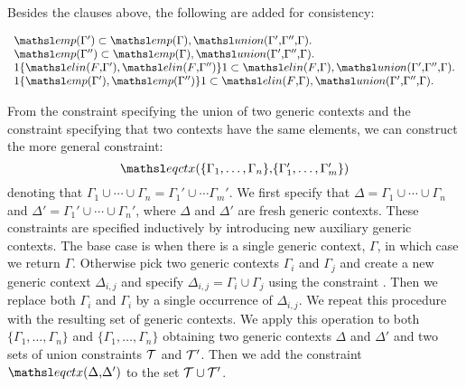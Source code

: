 Besides the clauses above, the following are added for consistency:

$$
\begin{array}{l}
\emp{\Gamma'} \subset \emp{\Gamma}, \union{\Gamma'}{\Gamma''}{\Gamma}. \\
\emp{\Gamma''} \subset \emp{\Gamma}, \union{\Gamma'}{\Gamma''}{\Gamma}. \\
1 \{ \elin{F}{\Gamma'}, \elin{F}{\Gamma''} \} 1 \subset \elin{F}{\Gamma},
\union{\Gamma'}{\Gamma''}{\Gamma}. \\
1 \{ \emp{\Gamma'}, \emp{\Gamma''} \} 1 \subset \elin{F}{\Gamma},
\union{\Gamma'}{\Gamma''}{\Gamma}. \\
\end{array}
$$

From the constraint specifying the union of two generic contexts and 
the constraint specifying that two contexts have the same elements, 
we can construct the more general constraint:
\[
 \eqctx{\{\Gamma_1, \ldots, \Gamma_n\}}{\{\Gamma_1', \ldots, \Gamma_m'\}}
\]
denoting that $\Gamma_1 \cup \cdots \cup \Gamma_n = \Gamma_1' \cup \cdots 
\Gamma_m'$. We first specify that $\Delta = \Gamma_1 \cup \cdots \cup
\Gamma_n$ and $\Delta' = \Gamma_1' \cup \cdots \cup
\Gamma_n'$, where $\Delta$ and $\Delta'$ are fresh generic contexts.
These constraints are specified inductively by introducing new auxiliary 
generic contexts. The base case is when there is a single generic context, 
$\Gamma$, in which case we return $\Gamma$. Otherwise pick two generic
contexts $\Gamma_i$ and $\Gamma_j$ and create a new generic context
$\Delta_{i,j}$ and specify $\Delta_{i,j} = \Gamma_i \cup \Gamma_j$ using 
the constraint . Then we replace 
both $\Gamma_i$ and $\Gamma_i$ by a single occurrence of $\Delta_{i,j}$.
We repeat this procedure with the resulting set of generic contexts. 
We apply this operation to both  $\{\Gamma_1, \ldots, \Gamma_n\}$ and
$\{\Gamma_1, \ldots, \Gamma_n\}$ obtaining two generic contexts $\Delta$
and $\Delta'$ and two sets of union constraints $\mathcal{T}$ and $\mathcal{T}'$. Then
we add the constraint $\eqctx{\Delta}{\Delta'}$ to the set $\mathcal{T} \cup
\mathcal{T}'$. 


